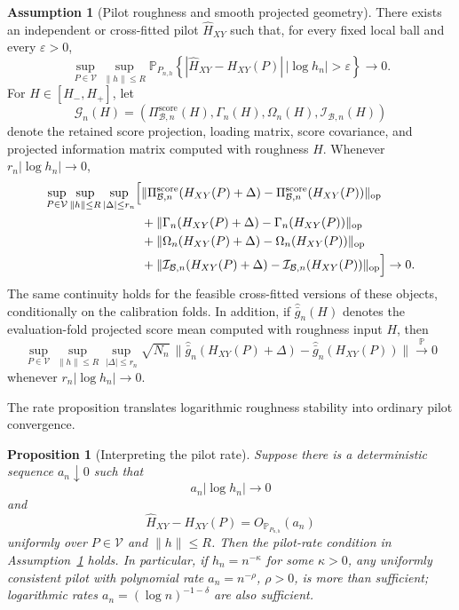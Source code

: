 \documentclass[11pt,a4paper]{amsart}
\theoremstyle{plain}
\newtheorem{proposition}[theorem]{Proposition}
\theoremstyle{definition}
\newtheorem{assumption}[theorem]{Assumption}
\theoremstyle{remark}
\newcommand{\PP}{\mathbb{P}}
\newcommand{\toP}{\xrightarrow{\PP}}
\newcommand{\scrB}{\mathcal{B}}
\newcommand{\scrI}{\mathcal{I}}
\begin{document}
\begin{assumption}[Pilot roughness and smooth projected geometry]\label{ass:pilot-roughness-smooth}
There exists an independent or cross-fitted pilot \(\widehat H_{XY}\) such that, for every fixed
local ball and every \(\varepsilon>0\),
\[
        \sup_{P\in\mathcal V}
        \sup_{\|h\|\le R}
        \PP_{P_{n,h}}
        \left\{
        |\widehat H_{XY}-H_{XY}(P)|\,|\log h_n|>\varepsilon
        \right\}
        \to0.
\]
For \(H\in[H_-,H_+]\), let
\[
        \mathcal G_n(H)
        =
        \left(
        \Pi_{\scrB,n}^{\mathrm{score}}(H),
        \Gamma_n(H),
        \Omega_n(H),
        \scrI_{\scrB,n}(H)
        \right)
\]
denote the retained score projection, loading matrix, score covariance, and projected information
matrix computed with roughness \(H\).  Whenever \(r_n|\log h_n|\to0\),
\[
\begin{aligned}
        \sup_{P\in\mathcal V}
        \sup_{\|h\|\le R}
        \sup_{|\Delta|\le r_n}
        \Bigl[
        &\|\Pi_{\scrB,n}^{\mathrm{score}}(H_{XY}(P)+\Delta)
        -\Pi_{\scrB,n}^{\mathrm{score}}(H_{XY}(P))\|_{\mathrm{op}}  \\
        &+\|\Gamma_n(H_{XY}(P)+\Delta)-\Gamma_n(H_{XY}(P))\|_{\mathrm{op}}\\
        &+\|\Omega_n(H_{XY}(P)+\Delta)-\Omega_n(H_{XY}(P))\|_{\mathrm{op}}\\
        &+\|\scrI_{\scrB,n}(H_{XY}(P)+\Delta)-\scrI_{\scrB,n}(H_{XY}(P))\|_{\mathrm{op}}
        \Bigr]
        \to0 .
\end{aligned}
\]
The same continuity holds for the feasible cross-fitted versions of these objects, conditionally on
the calibration folds.  In addition, if \(\widehat{\bar g}_n(H)\) denotes the evaluation-fold
projected score mean computed with roughness input \(H\), then
\[
        \sup_{P\in\mathcal V}
        \sup_{\|h\|\le R}
        \sup_{|\Delta|\le r_n}
        \sqrt{N_n}\,
        \|\widehat{\bar g}_n(H_{XY}(P)+\Delta)-\widehat{\bar g}_n(H_{XY}(P))\|
        \toP 0
\]
whenever \(r_n|\log h_n|\to0\).
\end{assumption}

The rate proposition translates logarithmic roughness stability into ordinary pilot convergence.

\begin{proposition}[Interpreting the pilot rate]\label{prop:pilot-rate-interpretation}
Suppose there is a deterministic sequence \(a_n\downarrow0\) such that
\[
        a_n|\log h_n|\to0
\]
and
\[
        \widehat H_{XY}-H_{XY}(P)
        =
        O_{\PP_{P_{n,h}}}(a_n)
\]
uniformly over \(P\in\mathcal V\) and \(\|h\|\le R\).  Then the pilot-rate condition in
Assumption~\ref{ass:pilot-roughness-smooth} holds.  In particular, if \(h_n=n^{-\kappa}\) for some
\(\kappa>0\), any uniformly consistent pilot with polynomial rate \(a_n=n^{-\rho}\), \(\rho>0\),
is more than sufficient; logarithmic rates \(a_n=(\log n)^{-1-\delta}\) are also sufficient.
\end{proposition}
\end{document}
